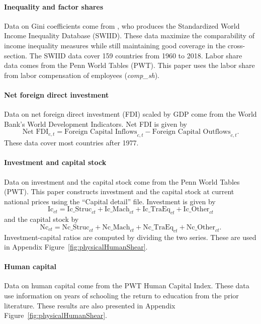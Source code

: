 \paragraph{Inequality and factor shares}
Data on Gini coefficients come from \cite{Solt2020}, who produces the Standardized World Income Inequality Database (SWIID). These data maximize the comparability of income inequality measures while still maintaining good coverage in the cross-section. The SWIID data cover 159 countries from 1960 to 2018. Labor share data comes from the Penn World Tables (PWT). This paper uses the labor share from labor compensation of employees (\textit{comp\_sh}).

\paragraph{Net foreign direct investment }
Data on net foreign direct investment (FDI) scaled by GDP come from the World Bank's World Development Indicators. Net FDI is given by
\begin{equation}
\text{Net FDI}_{c,t} = \text{Foreign Capital Inflows}_{c,t} - \text{Foreign Capital Outflows}_{c,t}.
\end{equation}
These data cover most countries after 1977.

\paragraph{Investment and capital stock}
Data on investment and the capital stock come from the Penn World Tables (PWT). This paper constructs investment and the capital stock at current national prices using the ``Capital detail'' file.  Investment is given by
\begin{equation}
\text{Ic}_{ct} = \text{Ic\_Struc}_{ct} + \text{Ic\_Mach}_{ct} + \text{Ic\_TraEq}_{ct} + \text{Ic\_Other}_{ct}
\end{equation}
and the capital stock by
\begin{equation}
\text{Nc}_{ct} = \text{Nc\_Struc}_{ct} + \text{Nc\_Mach}_{ct} + \text{Nc\_TraEq}_{ct} + \text{Nc\_Other}_{ct}.
\end{equation}
Investment-capital ratios are computed by dividing the two series. These are used in Appendix Figure~\ref{fig:physicalHumanShear}.

\paragraph{Human capital}
Data on human capital come from the PWT Human Capital Index. These data use information on years of schooling the return to education from the prior literature. These results are also presented in Appendix Figure~\ref{fig:physicalHumanShear}.

